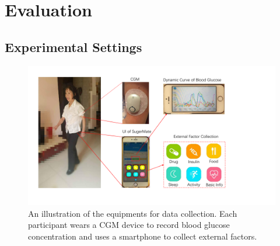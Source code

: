 \section{Evaluation}
\label{sec:eval}

\subsection{Experimental Settings}
\begin{figure}[h]
  \centering
  \includegraphics[width=0.7\columnwidth]{./img/UI1.pdf}
  \caption{An illustration of the equipments for data collection. Each participant wears a CGM device to record blood glucose concentration and uses a smartphone to collect external factors. }
  \label{fig:experiment_case}
\end{figure}

